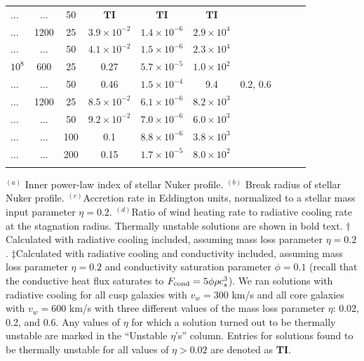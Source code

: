 \documentclass[usenatbib,fleqn]{mn2e}
\begin{document}
\begin{table}
\begin{threeparttable}
\begin{minipage}{18cm}
\begin{tabular}{lccccccccc}
... & ... & 50 & $\mathbf{TI}$ & $\mathbf{TI}$ & $\mathbf{TI}$ \\
... & 1200 & 25 & $ 3.9 \times 10^{ -2 }$ & $ 1.4 \times 10^{ -6 }$ & $ 2.9 \times 10^{ 4 }$ \\
 ... & ... & 50 & $ 4.1 \times 10^{ -2 }$ & $ 1.5 \times 10^{ -6 }$ & $ 2.3 \times 10^{ 4 }$ \\
$    10^{ 8 }$ & 600 & 25 & 0.27 & $ 5.7 \times 10^{ -5 }$ & $ 1.0 \times 10^{ 2 }$ \\
... & ... & 50 & 0.46 & $ 1.5 \times 10^{ -4 }$ & 9.4 & 0.2, 0.6\\
... & 1200 & 25 & $ 8.5 \times 10^{ -2 }$ & $ 6.1 \times 10^{ -6 }$ & $ 8.2 \times 10^{ 3 }$ \\
... & ... & 50 & $ 9.2 \times 10^{ -2 }$ & $ 7.0 \times 10^{ -6 }$ & $ 6.0 \times 10^{ 3 }$ \\
... & ... & 100 & 0.1 & $ 8.8 \times 10^{ -6 }$ & $ 3.8 \times 10^{ 3 }$ \\
... & ... & 200 & 0.15 & $ 1.7 \times 10^{ -5 }$ & $ 8.0 \times 10^{ 2 }$ \\
\hline
\label{table:models}  
\end{tabular}
\begin{tablenotes}
\item $^{(a)}$ Inner power-law index of stellar Nuker profile.
  $^{(b)}$ Break radius of stellar Nuker profile.  $^{(c)}$Accretion
  rate in Eddington units, normalized to a stellar mass input
  parameter $\eta = 0.2$.  $^{(d)}$Ratio of wind heating rate to
  radiative cooling rate at the stagnation radius.  Thermally unstable
  solutions are shown in bold text.  $\dagger$Calculated with
  radiative cooling included, assuming mass loss parameter $\eta =
  0.2$.  $\ddagger$Calculated with radiative cooling and conductivity
  included, assuming mass loss parameter $\eta = 0.2$ and conductivity
  saturation parameter $\phi = 0.1$ (recall that the conductive heat
  flux saturates to $F_{\rm cond}=5\phi \rho c_s^3$). We ran solutions
  with radiative cooling for all cusp galaxies with $v_w=300 $ km/s
  and all core galaxies with $v_w=600 $ km/s with three different
  values of the mass loss parameter $\eta$: 0.02, 0.2, and 0.6. Any
  values of $\eta$ for which a solution turned out to be thermally
  unstable are marked in the ``Unstable $\eta$'s'' column.  Entries
  for solutions found to be thermally unstable for all values of $\eta
  > 0.02$ are denoted as {\bf TI}.
\end{tablenotes}
\end{minipage}
\end{threeparttable}

\end{table}
\end{document}
